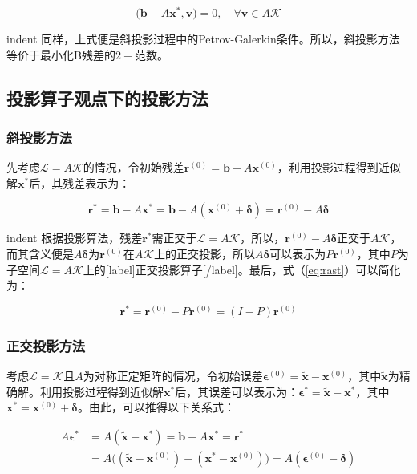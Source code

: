 \documentclass[UTF8,nofonts]{ctexart}
\begin{document}
\[
\big(\boldsymbol{b}-A\boldsymbol{x}^\ast,\boldsymbol{v}\big)=0,\quad\forall\boldsymbol{v}\in A\mathcal{K}
\]

indent 同样，上式便是斜投影过程中的Petrov-Galerkin条件。所以，斜投影方法等价于最小化B残差的$2-$范数。

\subsection*{投影算子观点下的投影方法}

\subsubsection*{斜投影方法}

先考虑$\mathcal{L}=A\mathcal{K}$的情况，令初始残差$\boldsymbol{r}^{(0)}=\boldsymbol{b}-A\boldsymbol{x}^{(0)}$，利用投影过程得到近似解$\boldsymbol{x}^\ast$后，其残差表示为：

\begin{equation}
\label{eq:rast}
\boldsymbol{r}^\ast=\boldsymbol{b}-A\boldsymbol{x}^\ast=\boldsymbol{b}-A(\boldsymbol{x}^{(0)}+\boldsymbol{\delta})=\boldsymbol{r}^{(0)}-A\boldsymbol{\delta}
\end{equation}

indent 根据投影算法，残差$\boldsymbol{r}^\ast$需正交于$\mathcal{L}=A\mathcal{K}$，所以，$\boldsymbol{r}^{(0)}-A\boldsymbol{\delta}$正交于$A\mathcal{K}$，而其含义便是$A\boldsymbol{\delta}$为$\boldsymbol{r}^{(0)}$在$A\mathcal{K}$上的正交投影，所以$A\boldsymbol{\delta}$可以表示为$P\boldsymbol{r}^{(0)}$，其中$P$为子空间$\mathcal{L}=A\mathcal{K}$上的[label]正交投影算子[/label]。最后，式（\ref{eq:rast}）可以简化为：

\[
\boldsymbol{r}^\ast=\boldsymbol{r}^{(0)}-P\boldsymbol{r}^{(0)}=(I-P)\boldsymbol{r}^{(0)}
\]

\subsubsection*{正交投影方法}

考虑$\mathcal{L}=\mathcal{K}$且$A$为对称正定矩阵的情况，令初始误差$\boldsymbol{\epsilon}^{(0)}=\tilde{\boldsymbol{x}}-\boldsymbol{x}^{(0)}$，其中$\tilde{\boldsymbol{x}}$为精确解。利用投影过程得到近似解$\boldsymbol{x}^\ast$后，其误差可以表示为：$\boldsymbol{\epsilon}^\ast=\tilde{\boldsymbol{x}}-\boldsymbol{x}^\ast$，其中$\boldsymbol{x}^\ast=\boldsymbol{x}^{(0)}+\boldsymbol{\delta}$。由此，可以推得以下关系式：

\begin{align*}
A\boldsymbol{\epsilon}^\ast&=A(\tilde{\boldsymbol{x}}-\boldsymbol{x}^\ast)=\boldsymbol{b}-A\boldsymbol{x}^\ast=\boldsymbol{r}^\ast \\
&=A\Big((\tilde{\boldsymbol{x}}-\boldsymbol{x}^{(0)})-(\boldsymbol{x}^\ast-\boldsymbol{x}^{(0)})\Big)=A(\boldsymbol{\epsilon}^{(0)}-\boldsymbol{\delta})
\end{align*}
\end{document}
